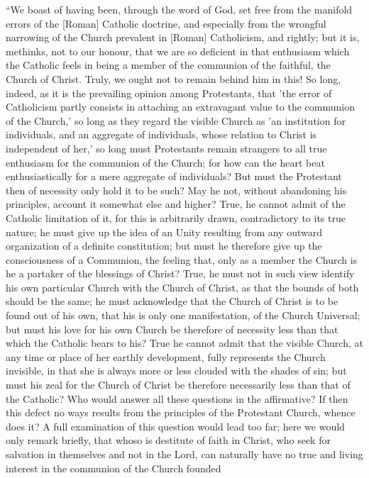 ``We boast of having been, through the word of God,
set free from the manifold errors of the [Roman] Catholic doctrine, and
especially from the wrongful narrowing of the Church prevalent in
[Roman] Catholicism, and rightly; but it is, methinks, not to our honour,
that we are so deficient in that enthusiasm which the Catholic feels in
being a member of the communion of the faithful, the Church of Christ.
Truly, we ought not to remain behind him in this! So long, indeed, as it
is the prevailing opinion among Protestants, that 'the error of
Catholicism partly consists in attaching an extravagant value to the
communion of the Church,' so long as they regard the visible Church as 'an
institution for individuals, and an aggregate of individuals, whose
relation to Christ is independent of her,' so long must Protestants
remain strangers to all true enthusiasm for the communion of the Church;
for how can the heart beat enthusiastically for a mere aggregate of
individuals? But must the Protestant then of necessity only hold it to
be such? May he not, without abandoning his principles, account it
somewhat else and higher? True, he cannot admit of the Catholic
limitation of it, for this is arbitrarily drawn, contradictory to its
true nature; he must give up the idea of an Unity resulting from any
outward organization of a definite constitution; but must he
therefore give up the consciousness of a Communion, the feeling that,
only as a member the Church is he a partaker of the blessings of Christ?
True, he must not in such view identify his own particular Church with
the Church of Christ, as that the bounds of both should be the same; he
must acknowledge that the Church of Christ is to be found out of his
own, that his is only one manifestation, of the Church Universal; but
must his love for his own Church be therefore of necessity less than
that which the Catholic bears to his? True he cannot admit that the
visible Church, at any time or place of her earthly development, fully
represents the Church invisible, in that she is always more or less
clouded with the shades of sin; but must his zeal for the Church of
Christ be therefore necessarily less than that of the Catholic? Who
would answer all these questions in the affirmative? If then this defect
no ways results from the principles of the Protestant Church, whence
does it? A full examination of this question would lead too far; here we
would only remark briefly, that whoso is destitute of faith in Christ,
who seek for salvation in themselves and not in the Lord, can naturally
have no true and living interest in the communion of the Church founded
